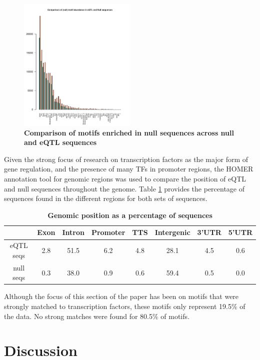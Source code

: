 \documentclass[12pt]{article}
\begin{document}
\begin{figure}[!htbp]
\centering
\includegraphics[width= 0.5\textwidth]{nullMotifsComparison.pdf} 
\caption{\bf{Comparison of motifs enriched in null sequences across null and eQTL sequences}}
\label{nullMotifComparison}
\end{figure}

Given the strong focus of research on transcription factors as the major form of gene regulation, and the presence of many TFs in promoter regions, the HOMER annotation tool for genomic regions was used to compare the position of eQTL and null sequences throughout the genome. Table \ref{genomicPosition} provides the percentage of sequences found in the different regions for both sets of sequences.

\begin{table}
\caption{\bf{Genomic position as a percentage of sequences}}
\label{genomicPosition}
\centering
\begin{tabular}{|c|c|c|c|c|c|c|c|}
\hline
& Exon & Intron & Promoter & TTS & Intergenic & 3'UTR & 5'UTR\\
\hline
eQTL seqs & 2.8 & 51.5 & 6.2 & 4.8 & 28.1 & 4.5 & 0.6\\
\hline
null seqs & 0.3 & 38.0 & 0.9 & 0.6 & 59.4 & 0.5 & 0.0\\
\hline
\end{tabular}
\end{table}

Although the focus of this section of the paper has been on motifs that were strongly matched to transcription factors, these motifs only represent 19.5\% of the data. No strong matches were found for 80.5\% of motifs. 


\section{Discussion}
\end{document}
